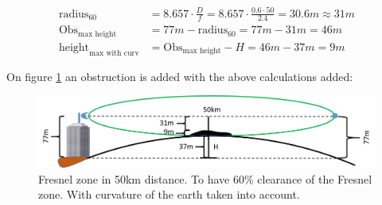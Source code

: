 \begin{align*}
\text{radius}_{60} &= 8.657\cdot \frac{D}{f} = 8.657\cdot \frac{0.6\cdot 50}{2.4} = 30.6m \approx 31m \\
\text{Obs}_{\text{max height}} &= 77m - \text{radius}_{60} = 77m - 31m = 46m \\
\text{height}_{\text{max with curv}} &= \text{Obs}_{\text{max height}} - H = 46m - 37m = 9m
\end{align*}

\noindent On figure \ref{fig:fresnel_50km_curvature_obstacle} an obstruction is added with the above calculations added:

\begin{figure}[H]
	\centering
	\includegraphics[scale=0.50]{figures/fresnel_50km_curvature_obstacle.png}
	\caption{Fresnel zone in 50km distance. To have 60\% clearance of the Fresnel zone. With curvature of the earth taken into account.}
	\label{fig:fresnel_50km_curvature_obstacle}
\end{figure}  

